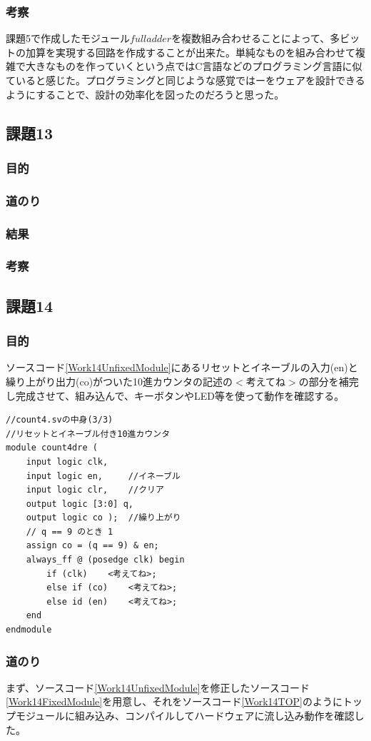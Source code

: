 \documentclass[a4paper]{jarticle}
\begin{document}
\subsubsection{考察}
課題5で作成したモジュール$fulladder$を複数組み合わせることによって、多ビットの加算を実現する回路を作成することが出来た。単純なものを組み合わせて複雑で大きなものを作っていくという点ではC言語などのプログラミング言語に似ていると感じた。プログラミングと同じような感覚ではーをウェアを設計できるようにすることで、設計の効率化を図ったのだろうと思った。
\subsection{課題13}
\subsubsection{目的}
\subsubsection{道のり}
\subsubsection{結果}
\subsubsection{考察}
\subsection{課題14}
\subsubsection{目的}
ソースコード\ref{Work14UnfixedModule}にあるリセットとイネーブルの入力(en)と繰り上がり出力(co)がついた10進カウンタの記述の$<$考えてね$>$の部分を補完し完成させて、組み込んで、キーボタンやLED等を使って動作を確認する。
\begin{lstlisting}[caption=count4.sv,label=Work14UnfixedModule]
//count4.svの中身(3/3)
//リセットとイネーブル付き10進カウンタ
module count4dre (
	input logic clk,
	input logic en,		//イネーブル
	input logic clr,	//クリア
	output logic [3:0] q,
	output logic co );	//繰り上がり
	// q == 9 のとき 1
	assign co = (q == 9) & en;
	always_ff @ (posedge clk) begin
		if (clk)	<考えてね>;
		else if (co)	<考えてね>;
		else id (en)	<考えてね>;
	end
endmodule
\end{lstlisting}
\subsubsection{道のり}
まず、ソースコード\ref{Work14UnfixedModule}を修正したソースコード\ref{Work14FixedModule}を用意し、それをソースコード\ref{Work14TOP}のようにトップモジュールに組み込み、コンパイルしてハードウェアに流し込み動作を確認した。


\end{document}
